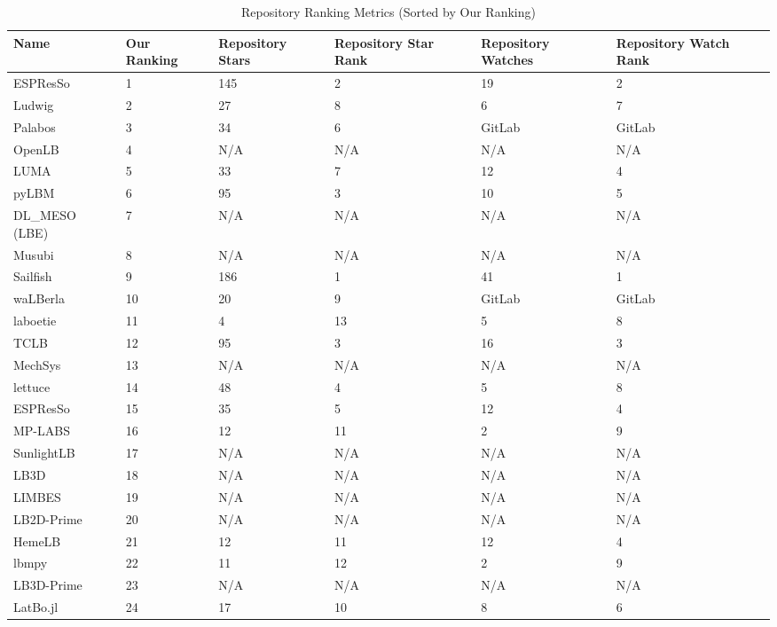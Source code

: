 \documentclass[final, 3p, times, authoryear]{elsarticle}
\newcommand{\esp}{ESPResSo\nolinebreak\hspace{-.05em}\raisebox{.4ex}{\small\bf
+}\nolinebreak\hspace{-.10em}\raisebox{.4ex}{\small\bf +}}
\begin{document}
\begin{table}[ht!]
	\begin{center}
		\begin{tabular}{ p{3cm}p{1.25cm}p{1.75cm}p{1.75cm}p{1.75cm}p{1.75cm} }
			\toprule
			Name & Our Ranking & Repository Stars & Repository Star Rank &
			Repository Watches & Repository Watch Rank\\
			\midrule
			ESPResSo & 1 & 145 & 2 & 19& 2\\
			Ludwig & 2 & 27 & 8 & 6 & 7\\
			Palabos & 3 & 34 & 6 & GitLab & GitLab\\
			OpenLB & 4 & N/A & N/A & N/A& N/A\\
			LUMA & 5 & 33 & 7 & 12& 4\\
			pyLBM & 6 & 95 & 3 & 10& 5\\
			DL\_MESO (LBE) & 7 & N/A & N/A & N/A & N/A\\
			Musubi & 8 & N/A & N/A & N/A & N/A\\
			Sailfish & 9 & 186 & 1 & 41& 1\\
			waLBerla & 10 & 20 & 9 & GitLab & GitLab\\
			laboetie & 11 & 4 & 13 & 5 & 8\\
			TCLB & 12 & 95 & 3 & 16 & 3\\
			MechSys & 13 & N/A & N/A & N/A & N/A\\
			lettuce & 14 & 48 & 4 & 5 & 8\\
			\esp & 15 & 35 & 5 & 12 & 4\\
			MP-LABS & 16 & 12 & 11 & 2 & 9\\			
			SunlightLB & 17 & N/A & N/A & N/A & N/A\\
			LB3D & 18 & N/A & N/A & N/A & N/A\\			
			LIMBES & 19 & N/A & N/A & N/A & N/A\\
			LB2D-Prime & 20 & N/A & N/A & N/A & N/A\\		
			HemeLB & 21 & 12 & 11 & 12 & 4\\
			lbmpy & 22 &  11 & 12 & 2 & 9\\	
			LB3D-Prime & 23 & N/A & N/A & N/A & N/A\\	
			LatBo.jl & 24 & 17 & 10 & 8 & 6\\			
			\bottomrule
		\end{tabular}
		\caption{Repository Ranking Metrics (Sorted by Our Ranking)} \label{repometrics}
	\end{center}
\end{table}
\end{document}
